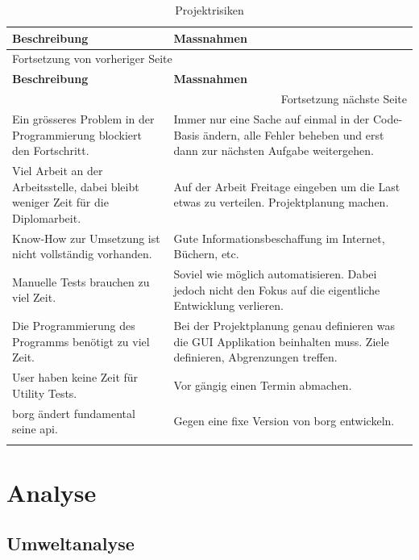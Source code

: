 \begin{longtable}{|p{}|p{}|}
\hline
\textbf{Beschreibung}\cellcolor[HTML]{C0C0C0} & \textbf{Massnahmen}\cellcolor[HTML]{C0C0C0}\\
\hline
\endfirsthead
\multicolumn{2}{l}{Fortsetzung von vorheriger Seite} \\
\hline

\textbf{Beschreibung}\cellcolor[HTML]{C0C0C0} & \textbf{Massnahmen}\cellcolor[HTML]{C0C0C0} \\

\hline
\endhead
\hline\multicolumn{2}{r}{Fortsetzung nächste Seite} \\
\endfoot
\endlastfoot
\hline
Ein grösseres Problem in der Programmierung blockiert den Fortschritt. & Immer nur eine Sache auf einmal in der Code-Basis ändern, alle Fehler beheben und erst dann zur nächsten Aufgabe weitergehen.\\
\hline
Viel Arbeit an der Arbeitsstelle, dabei bleibt weniger Zeit für die Diplomarbeit. & Auf der Arbeit Freitage eingeben um die Last etwas zu verteilen. Projektplanung machen.\\
\hline
Know-How zur Umsetzung ist nicht vollständig vorhanden. & Gute Informationsbeschaffung im Internet, Büchern, etc.\\
\hline
Manuelle Tests brauchen zu viel Zeit. & Soviel wie möglich automatisieren. Dabei jedoch nicht den Fokus auf die eigentliche Entwicklung verlieren.\\
\hline
Die Programmierung des Programms benötigt zu viel Zeit. & Bei der Projektplanung genau definieren was die GUI Applikation beinhalten muss. Ziele definieren, Abgrenzungen treffen.\\
\hline
User haben keine Zeit für Utility Tests. & Vor gängig einen Termin abmachen.\\
\hline
\gls{borg} ändert fundamental seine \gls{api}. & Gegen eine fixe Version von \gls{borg} entwickeln.\\
\hline
\caption{\label{tab:orge9ee080}
Projektrisiken}
\\
\end{longtable}

\section{Analyse}
\label{sec:org7504602}
\subsection{Umweltanalyse}
\label{sec:org4b546fd}

